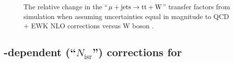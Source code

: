\begin{figure}[!h]
{  } \\
   ~
   \\
  \caption{\label{fig:tfSyst_nlo_muToTtw} The relative change in the
    ``$\mu + \textrm{jets} \rightarrow \mathrm{tt+W}$'' transfer factors from
    simulation when assuming uncertainties equal in magnitude to QCD +
    EWK NLO corrections versus W boson \Pt.  }
\end{figure}

\clearpage
\subsection{\texorpdfstring{\njet}{Njet}-dependent (``\texorpdfstring{$N_\textrm{isr}$}{Nisr}'') corrections for \ttbar}

